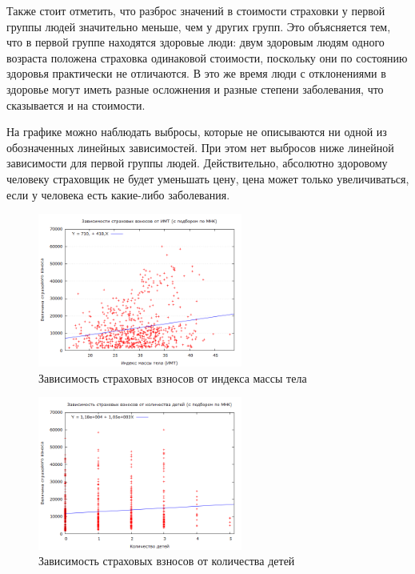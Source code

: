 \documentclass[a4paper,12pt]{article}
\begin{document}
Также стоит отметить, что разброс значений в стоимости страховки у первой группы людей значительно меньше, чем у других групп. Это объясняется тем, что в первой группе находятся здоровые люди: двум здоровым людям одного возраста положена страховка одинаковой стоимости, поскольку они по состоянию здоровья практически не отличаются. В это же время люди с отклонениями в здоровье могут иметь разные осложнения и разные степени заболевания, что сказывается и на стоимости.

На графике можно наблюдать выбросы, которые не описываются ни одной из обозначенных линейных зависимостей. При этом нет выбросов ниже линейной зависимости для первой группы людей. Действительно, абсолютно здоровому человеку страховщик не будет уменьшать цену, цена может только увеличиваться, если у человека есть какие-либо заболевания. 

\begin{figure}[H]
	\includegraphics[width=0.6\textwidth]{../[graphics]/сharges-bmi.png}
	\centering
	\caption{Зависимость страховых взносов от индекса массы тела}
	\label{fig:charges-bmi}
\end{figure}

\begin{figure}[H]
	\includegraphics[width=0.6\textwidth]{../[graphics]/charges-children.png}
	\centering
	\caption{Зависимость страховых взносов от количества детей}
	\label{fig:charges-children}
\end{figure}
\end{document}
